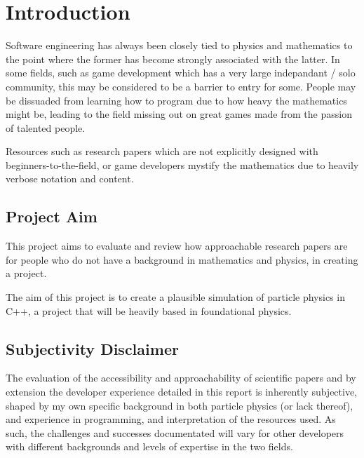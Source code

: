 \chapter{Introduction}

Software engineering has always been closely tied to physics and mathematics to the point where the former has become strongly associated with 
the latter. In some fields, such as game development which has a very large indepandant / solo community, this may be considered to be a barrier to 
entry for some. People may be dissuaded from learning how to program due to how heavy the mathematics might be, leading to the field missing out on 
great games made from the passion of talented people.

Resources such as research papers which are not explicitly designed with beginners-to-the-field, or game developers mystify the mathematics due to
heavily verbose notation and content.

\section{Project Aim}

This project aims to evaluate and review how approachable research papers are for people who do not have a background in mathematics and physics,
in creating a project.

The aim of this project is to create a plausible simulation of particle physics in C++, a project that will be heavily based in foundational physics.

\section{Subjectivity Disclaimer}

The evaluation of the accessibility and approachability of scientific papers and by extension the developer experience detailed
in this report is inherently subjective, shaped by my own specific background in both particle physics (or lack thereof),
and experience in programming, and interpretation of the resources used. As such, the challenges and successes documentated
will vary for other developers with different backgrounds and levels of expertise in the two fields.
